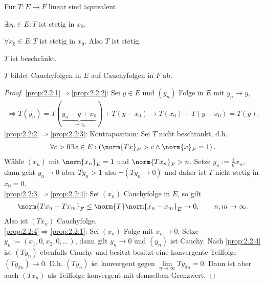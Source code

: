 \begin{prop}
\label{prop:2.2}
Für $T: E\to F$ linear sind äquivalent
\begin{equivenum}
  \item\label{prop:2.2:1} $\exists x_0\in E : T $ ist stetig in $x_0$.
  \item\label{prop:2.2:2} $\forall x_0\in E : T$ ist stetig in $x_0$. Also $T$
  ist stetig.
  \item\label{prop:2.2:3} $T$ ist beschränkt.
  \item\label{prop:2.2:4} $T$ bildet Cauchyfolgen in $E$ auf Cauchyfolgen in
  $F$ ab.\fishhere
\end{equivenum}
\end{prop}
\begin{proof}
\ref{prop:2.2:1}$\Rightarrow$\ref{prop:2.2:2}: Sei $y\in E$ und $(y_n)$ Folge
in $E$ mit $y_n\to y$,
\begin{align*}
\Rightarrow T(y_n) = T(\underbrace{y_n -y+x_0}_{\to x_0})+ T(y-x_0) \to T(x_0)
+ T(y-x_0)  = T(y).
\end{align*}
\ref{prop:2.2:2}$\Rightarrow$\ref{prop:2.2:3}: Kontraposition: Sei
$T$ nicht beschränkt, d.h.
\begin{align*}
\forall c > 0 \exists x\in E : \left( \norm{Tx}_F > c \land \norm{x}_E =1
\right).
\end{align*}
Wähle $(x_n)$ mit $\norm{x_n}_E =1$ und $\norm{Tx_n}_F > n$. Setze $y_n:=
\frac{1}{n}x_n$, dann geht $y_n\to 0$ aber $Ty_n > 1$ also $\neg(Ty_n\to 0)$ und
daher ist $T$ nicht stetig in $x_0=0$.\\
\ref{prop:2.2:3}$\Rightarrow$\ref{prop:2.2:4}:
Sei $(x_n)$ Cauchyfolge in $E$, so gilt
\begin{align*}
\norm{Tx_n - Tx_m}_F \le \norm{T}\norm{x_n-x_m}_E \to 0,\qquad n,m\to \infty.
\end{align*}
Also ist $(Tx_n)$ Cauchyfolge.\\
\ref{prop:2.2:4}$\Rightarrow$\ref{prop:2.2:1}:
Sei $(x_n)$ Folge mit $x_n\to 0$. Setze $y_n := (x_1,0,x_2,0,\ldots)$, dann
gilt $y_n\to 0$ und $(y_n)$ ist Cauchy. Nach \ref{prop:2.2:4} ist $(Ty_n)$
ebenfalls Cauchy und besitzt besitzt eine konvergente Teilfolge $(Ty_{2n})\to
0$. D.h. $(Ty_n)$ ist konvergent gegen $\lim\limits_{n\to\infty} Ty_{2n} = 0$.
Dann ist aber auch $(Tx_n)$ als Teilfolge konvergent mit demselben
Grenzwert.\qedhere
\end{proof}

